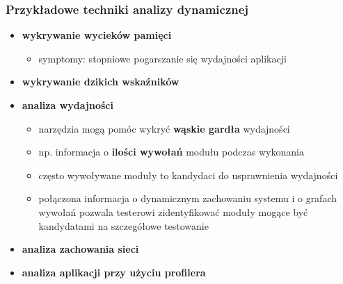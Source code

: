 \documentclass[../main.tex]{subfiles}
\begin{document}
    \subsubsection{Przykładowe techniki analizy dynamicznej}
    \begin{itemize}
        \item \textbf{wykrywanie wycieków pamięci}
        \begin{itemize}
            \item symptomy: stopniowe pogarszanie się wydajności aplikacji
        \end{itemize}
        \item \textbf{wykrywanie dzikich wskaźników}
        \item \textbf{analiza wydajności}
        \begin{itemize}
            \item narzędzia mogą pomóc wykryć \textbf{wąskie gardła} wydajności
            \item np. informacja o \textbf{ilości wywołań} modułu podczas wykonania
            \item często wywoływane moduły to kandydaci do usprawnienia wydajności
            \item połączona informacja o dynamicznym zachowaniu systemu i o grafach
            wywołań pozwala testerowi zidentyfikować moduły mogące być kandydatami na szczegółowe testowanie
        \end{itemize}

        \item \textbf{analiza zachowania sieci}
        \item \textbf{analiza aplikacji przy użyciu profilera}
    \end{itemize}
\end{document}
